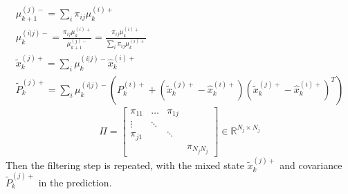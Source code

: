 \begin{enumerate}
\begin{gather}
  \mu_{k+1}^{(j)-} = \sum_i \pi_{ij}\mu_k^{(i)+}\\
  \mu_k^{(i|j)-} = \frac{\pi_{ij}\mu_k^{(i)+}}{\mu_{k+1}^{(j)-}} = \frac{\pi_{ij}\mu_k^{(i)+}}{\sum_i \pi_{ij}\mu_k^{(i)+}}\\
  \tilde{x}_k^{(j)+} = \sum_i \mu_k^{(i|j)-} \hat{x}_k^{(i)+}\\
  \tilde{P}_k^{(j)+} = \sum_i \mu_k^{(i|j)-} \left(P_k^{(i)+} + \left(\tilde{x}_k^{(j)+} - \hat{x}_k^{(i)+}\right)\left(\tilde{x}_k^{(j)+} - \hat{x}_k^{(i)+}\right)^T\right)
\end{gather}
\begin{equation}
  \Pi = 
  \begin{bmatrix}
    \pi_{11} & \dots & \pi_{1j} & \\
    \vdots & \ddots & \\
    \pi_{j1} &  & \ddots \\
     & & & \pi_{N_jN_j}
  \end{bmatrix}
  \in \mathbb{R}^{N_j \times N_j}
\end{equation}
Then the filtering step is repeated, with the mixed state $\tilde{x}_k^{(j)+}$ and covariance $\tilde{P}_k^{(j)+}$ in the prediction.
\end{enumerate}

